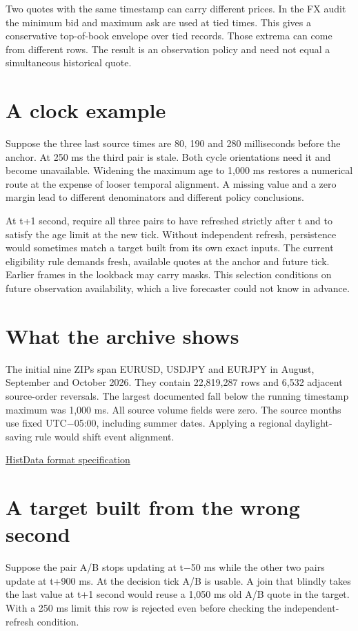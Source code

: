 \documentclass[11pt,oneside,openany]{book}
\begin{document}
Two quotes with the same timestamp can carry different prices. In the FX audit the minimum bid and maximum ask are used at tied times. This gives a conservative top-of-book envelope over tied records. Those extrema can come from different rows. The result is an observation policy and need not equal a simultaneous historical quote.

\section*{A clock example}
Suppose the three last source times are 80, 190 and 280 milliseconds before the anchor. At 250 ms the third pair is stale. Both cycle orientations need it and become unavailable. Widening the maximum age to 1,000 ms restores a numerical route at the expense of looser temporal alignment. A missing value and a zero margin lead to different denominators and different policy conclusions.

At t+1 second, require all three pairs to have refreshed strictly after t and to satisfy the age limit at the new tick. Without independent refresh, persistence would sometimes match a target built from its own exact inputs. The current eligibility rule demands fresh, available quotes at the anchor and future tick. Earlier frames in the lookback may carry masks. This selection conditions on future observation availability, which a live forecaster could not know in advance.

\section*{What the archive shows}
The initial nine ZIPs span EURUSD, USDJPY and EURJPY in August, September and October 2026. They contain 22,819,287 rows and 6,532 adjacent source-order reversals. The largest documented fall below the running timestamp maximum was 1,000 ms. All source volume fields were zero. The source months use fixed UTC\ensuremath{-}05:00, including summer dates. Applying a regional daylight-saving rule would shift event alignment.

{\small\sffamily\href{https://www.histdata.com/f-a-q/data-files-detailed-specification/}{HistData format specification}\par}
\section*{A target built from the wrong second}
Suppose the pair A/B stops updating at t\ensuremath{-}50 ms while the other two pairs update at t+900 ms. At the decision tick A/B is usable. A join that blindly takes the last value at t+1 second would reuse a 1,050 ms old A/B quote in the target. With a 250 ms limit this row is rejected even before checking the independent-refresh condition.
\end{document}
